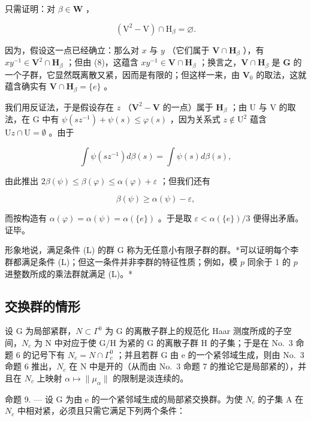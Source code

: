 只需证明：对 \(\beta \in \mathbf{W}\) ，

\[
(\mathrm{V} ^ {2} - \mathrm{V}) \cap \mathrm{H} _ {\beta} = \varnothing .\tag{8}
\]

因为，假设这一点已经确立：那么对 \(x\) 与 \(y\) （它们属于 \(\mathbf{V} \cap \mathbf{H}_{\beta}\) ），有 \(xy^{-1} \in \mathbf{V}^2 \cap \mathbf{H}_{\beta}\) ；但由 (8)，这蕴含 \(xy^{-1} \in \mathbf{V} \cap \mathbf{H}_{\beta}\) ；换言之，\(\mathbf{V} \cap \mathbf{H}_{\beta}\) 是 \(\mathbf{G}\) 的一个子群，它显然既离散又紧，因而是有限的；但这样一来，由 \(\mathbf{V}_0\) 的取法，这就蕴含确实有 \(\mathbf{V} \cap \mathbf{H}_{\beta} = \{e\}\) 。

我们用反证法，于是假设存在 \(z\) （\(\mathbf{V}^2 -\mathbf{V}\) 的一点）属于 \(\mathbf{H}_{\beta}\) ；由 U 与 V 的取法，在 G 中有 \(\psi (sz^{-1}) + \psi (s)\leqslant \varphi (s)\) ，因为关系式 \(z\notin \mathrm{U}^2\) 蕴含 \(\mathrm{U}z\cap \mathrm{U} = \emptyset\) 。由于

\[
\int \psi (s z ^ {- 1}) d \beta (s) = \int \psi (s) d \beta (s),
\]

由此推出 \(2\beta (\psi)\leqslant \beta (\varphi)\leqslant \alpha (\varphi) + \varepsilon\) ；但我们还有

\[
\beta (\psi) \geqslant \alpha (\psi) - \varepsilon ,
\]

而按构造有 \(\alpha(\varphi) = \alpha(\psi) = \alpha(\{e\})\) 。于是取 \(\varepsilon < \alpha(\{e\})/3\) 便得出矛盾。证毕。

形象地说，满足条件 (L) 的群 G 称为无任意小有限子群的群。*可以证明每个李群都满足条件 (L)；但这一条件并非李群的特征性质；例如，模 \(p\) 同余于 1 的 \(p\) 进整数所成的乘法群就满足 (L)。*

\subsection{交换群的情形}

设 G 为局部紧群，\(N \subset \Gamma^{0}\) 为 G 的离散子群上的规范化 Haar 测度所成的子空间，\(N_{c}\) 为 N 中对应于使 G/H 为紧的 G 的离散子群 H 的子集；于是在 No.~3 命题 6 的记号下有 \(N_{c} = N \cap \Gamma_{c}^{0}\) ；并且若群 G 由 e 的一个紧邻域生成，则由 No.~3 命题 6 推出，\(N_{c}\) 在 N 中是开的（从而由 No.~3 命题 7 的推论它是局部紧的），并且在 \(N_{c}\) 上映射 \(\alpha \mapsto \|\mu_{\alpha}\|\) 的限制是淡连续的。

命题 9. --- 设 G 为由 e 的一个紧邻域生成的局部紧交换群。为使 \(N_{c}\) 的子集 A 在 \(N_{c}\) 中相对紧，必须且只需它满足下列两个条件：

